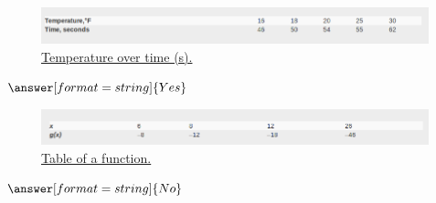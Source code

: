 \documentclass{ximera}
\begin{document}
\begin{question}
\begin{figure}
\includegraphics[scale=0.4]{temperature.png}
\caption{\href{https://cnx.org/contents/mwjClAV_@8.12:6dX4RGdg@12/Fitting-Linear-Models-to-Data}{Temperature over time (s).}}
\end{figure}
$\answer[format=string]{Yes}$
\end{question}

\begin{question}
\begin{figure}
\includegraphics[scale=0.4]{tableFunction.png}
\caption{\href{https://cnx.org/contents/mwjClAV_@8.12:6dX4RGdg@12/Fitting-Linear-Models-to-Data}{Table of a function.}}
\end{figure}
$\answer[format=string]{No}$
\end{question}
\end{document}
